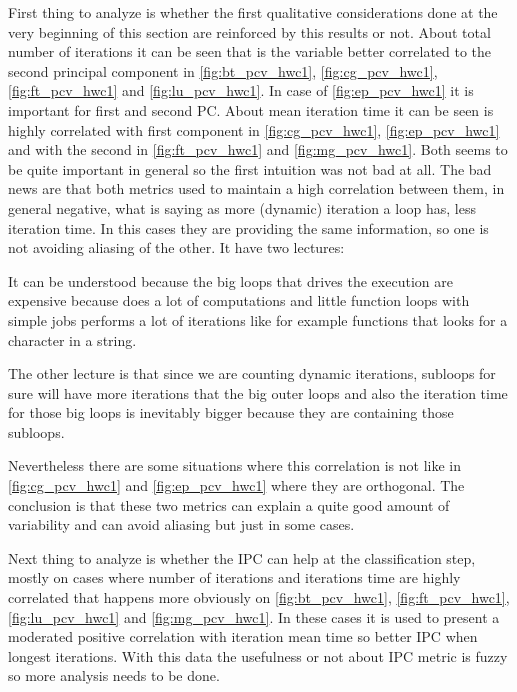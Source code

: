 First thing to analyze is whether the first qualitative considerations done at
the very beginning of this section are reinforced by this results or not. 
About total number of
iterations it can be seen that is the variable better correlated to the 
second principal component in \ref{fig:bt_pcv_hwc1}, \ref{fig:cg_pcv_hwc1},
\ref{fig:ft_pcv_hwc1} and \ref{fig:lu_pcv_hwc1}. In case of
\ref{fig:ep_pcv_hwc1} it is important for first and second PC. About mean 
iteration time it can be seen is highly correlated with first component in
\ref{fig:cg_pcv_hwc1}, \ref{fig:ep_pcv_hwc1} and with the second in
\ref{fig:ft_pcv_hwc1} and \ref{fig:mg_pcv_hwc1}. Both seems to be quite
important in general so the first intuition was not bad at all. The bad news are
that both metrics used to maintain a high correlation between them, in general
negative, what is saying as more (dynamic) iteration a loop has, less iteration
time. In this cases they are providing the same information, so one is not
avoiding aliasing of the other. It have two lectures:
\begin{enumerate*}[label=\roman*)]
  \item It can be understood because the big loops that drives the execution are
    expensive because does a lot of computations and little function loops with
    simple jobs performs a lot of iterations like for example functions that
    looks for a character in a string.
  \item The other lecture is that since we are counting dynamic iterations,
    subloops for sure will have more iterations that the big outer loops and
    also the iteration time for those big loops is inevitably bigger because
    they are containing those subloops.
\end{enumerate*}
Nevertheless there are some situations where this correlation is not like in
\ref{fig:cg_pcv_hwc1} and \ref{fig:ep_pcv_hwc1}  where they are orthogonal. The
conclusion is that these two metrics can explain a quite good amount of
variability and can avoid aliasing but just in some cases.

Next thing to analyze is whether the IPC can help at the
classification step, mostly on cases where number of iterations and iterations
time are highly correlated that happens more obviously on \ref{fig:bt_pcv_hwc1},
\ref{fig:ft_pcv_hwc1}, \ref{fig:lu_pcv_hwc1} and \ref{fig:mg_pcv_hwc1}. In these
cases it is used to present a moderated positive correlation with iteration mean
time so better IPC when longest iterations. With this data the usefulness or not
about IPC metric is fuzzy so more analysis needs to be done.

